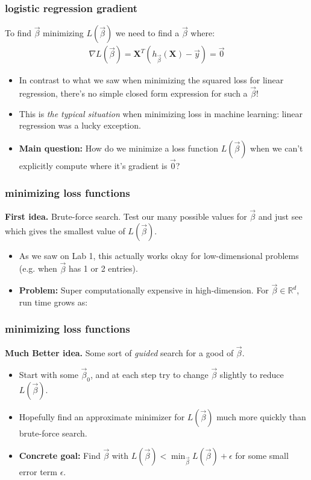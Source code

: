\documentclass[handout,compress]{beamer}
\newcommand{\bv}[1]{\mathbf{#1}}
\newcommand{\R}{\mathbb{R}}
\begin{document}
\begin{frame}
	\frametitle{logistic regression gradient}
	To find  $\vec{\beta}$ minimizing $L(\vec{\beta})$ we need to find a $\vec{\beta}$ where:
	\begin{align*}
	\nabla L(\vec{\beta})  = \bv{X}^T\left(h_{\vec{\beta}}(\bv{X}) - \vec{y}\right) = \vec{0}
	\end{align*}
	\begin{itemize}
		\item In contrast to what we saw when minimizing the squared loss for linear regression, there's no simple closed form expression for such a $\vec{\beta}$!
		\item This is \emph{the typical situation} when minimizing loss in machine learning: linear regression was a lucky exception.
		\item \textbf{Main question:} How do we minimize a loss function $L(\vec{\beta})$ when we can't explicitly compute where it's gradient is $\vec{0}$?
	\end{itemize}
\end{frame}

\begin{frame}[t]
	\frametitle{minimizing loss functions}
	\textbf{First idea.} Brute-force search. Test our many possible values for $\vec{\beta}$ and just see which gives the smallest value of $L(\vec{\beta})$. 
	\begin{itemize}
		\item As we saw on Lab 1, this actually works okay for low-dimensional problems (e.g. when $\vec{\beta}$ has 1 or 2 entries).
		\item \textbf{Problem:} Super computationally expensive in high-dimension. For $\vec{\beta} \in \R^d$, run time grows as:
	\end{itemize}
\end{frame}

\begin{frame}
	\frametitle{minimizing loss functions}
	\textbf{Much Better idea.} Some sort of \emph{\alert{guided}} search for a good of $\vec{\beta}$. 
\begin{itemize}
	\item Start with some $\vec{\beta}_0$, and at each step try to change $\vec{\beta}$ slightly to reduce $L(\vec{\beta})$. 
	\item Hopefully find an approximate minimizer for $L(\vec{\beta})$ much more quickly than brute-force search. 
	\item \textbf{Concrete goal:} Find $\vec{\beta}$ with $L(\vec{\beta}) < \min_{\vec{\beta}}L(\vec{\beta}) + \epsilon$ for some small error term $\epsilon$. 
\end{itemize}
\end{frame}
\end{document}
